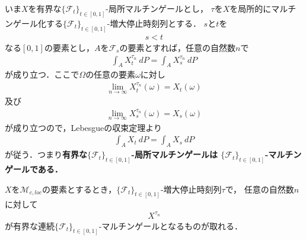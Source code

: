	いま$X$を有界な$\{\mathscr{F}_{t}\}_{t \in [0,1]}$-局所マルチンゲールとし，
	$\tau$を$X$を局所的にマルチンゲール化する$\{\mathscr{F}_{t}\}_{t \in [0,1]}$-増大停止時刻列とする．
	$s$と$t$を
	\begin{align}
		s < t
	\end{align}
	なる$[0,1]$の要素とし，$A$を$\mathscr{F}_{s}$の要素とすれば，任意の自然数$n$で
	\begin{align}
		\int_{A} X^{\tau_{n}}_{t}\ dP = \int_{A} X^{\tau_{n}}_{s}\ dP
	\end{align}
	が成り立つ．ここで$\Omega$の任意の要素$\omega$に対し
	\begin{align}
		\lim_{n \to \infty} X^{\tau_{n}}_{t}(\omega) = X_{t}(\omega)
	\end{align}
	及び
	\begin{align}
		\lim_{n \to \infty} X^{\tau_{n}}_{s}(\omega) = X_{s}(\omega)
	\end{align}
	が成り立つので，Lebesgueの収束定理より
	\begin{align}
		\int_{A} X_{t}\ dP = \int_{A} X_{s}\ dP
	\end{align}
	が従う．つまり{\bf 有界な$\{\mathscr{F}_{t}\}_{t \in [0,1]}$-局所マルチンゲールは
	$\{\mathscr{F}_{t}\}_{t \in [0,1]}$-マルチンゲールである．}
	
	\begin{screen}
		\begin{thm}
		\label{thm:increasing_stopping_times_which_locally_bound_martingale}
			$X$を$\mathscr{M}_{c,loc}$の要素とするとき，$\{\mathscr{F}_{t}\}_{t \in [0,1]}$-増大停止時刻列$\tau$で，
			任意の自然数$n$に対して
			\begin{align}
				X^{\tau_{n}}
			\end{align}
			が有界な連続$\{\mathscr{F}_{t}\}_{t \in [0,1]}$-マルチンゲールとなるものが取れる．
		\end{thm}
	\end{screen}
	
